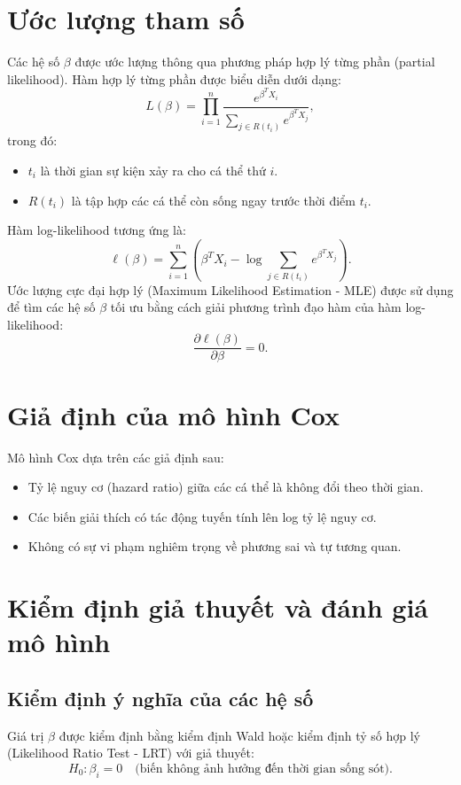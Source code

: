 \section{Ước lượng tham số}
Các hệ số $ \beta $ được ước lượng thông qua phương pháp hợp lý từng phần (partial likelihood). Hàm hợp lý từng phần được biểu diễn dưới dạng:
\begin{equation}
    L(\beta) = \prod_{i=1}^{n} \frac{e^{\beta^T X_i}}{\sum_{j \in R(t_i)} e^{\beta^T X_j}},
\end{equation}
trong đó:
\begin{itemize}
    \item $ t_i $ là thời gian sự kiện xảy ra cho cá thể thứ $ i $.
    \item $ R(t_i) $ là tập hợp các cá thể còn sống ngay trước thời điểm $ t_i $.
\end{itemize}
Hàm log-likelihood tương ứng là:
\begin{equation}
    \ell(\beta) = \sum_{i=1}^{n} \left( \beta^T X_i - \log \sum_{j \in R(t_i)} e^{\beta^T X_j} \right).
\end{equation}
Ước lượng cực đại hợp lý (Maximum Likelihood Estimation - MLE) được sử dụng để tìm các hệ số $ \beta $ tối ưu bằng cách giải phương trình đạo hàm của hàm log-likelihood:
\begin{equation}
    \frac{\partial \ell(\beta)}{\partial \beta} = 0.
\end{equation}

\section{Giả định của mô hình Cox}
Mô hình Cox dựa trên các giả định sau:
\begin{itemize}
    \item Tỷ lệ nguy cơ (hazard ratio) giữa các cá thể là không đổi theo thời gian.
    \item Các biến giải thích có tác động tuyến tính lên log tỷ lệ nguy cơ.
    \item Không có sự vi phạm nghiêm trọng về phương sai và tự tương quan.
\end{itemize}

\section{Kiểm định giả thuyết và đánh giá mô hình}
\subsection{Kiểm định ý nghĩa của các hệ số}
Giá trị $ \beta $ được kiểm định bằng kiểm định Wald hoặc kiểm định tỷ số hợp lý (Likelihood Ratio Test - LRT) với giả thuyết:
\begin{equation}
    H_0: \beta_i = 0 \quad \text{(biến không ảnh hưởng đến thời gian sống sót)}.
\end{equation}

